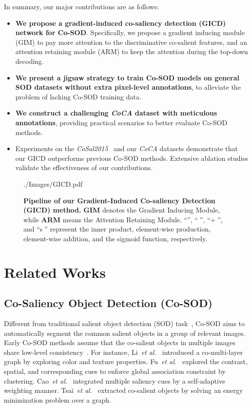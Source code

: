 \documentclass[runningheads,orivec]{llncs}
\def\etal{{\em et al.~}}
\begin{document}
In summary, our major contributions are as follows:
\begin{itemize}
	\item \textbf{We propose a gradient-induced co-saliency detection (GICD) network for Co-SOD}.
Specifically, we propose a gradient inducing module (GIM) to pay more attention to the discriminative co-salient features, and an attention retaining module (ARM) to keep the attention during the top-down decoding.
\item \textbf{We present a jigsaw strategy to train Co-SOD models on general SOD datasets without extra pixel-level annotations}, to alleviate the problem of lacking Co-SOD training data.
	\item \textbf{We construct a challenging \textit{CoCA} dataset with meticulous annotations}, providing practical scenarios to better evaluate Co-SOD methods.
	\item Experiments on the \textit{CoSal2015}~\cite{zhang2016CoSal} and our \textit{CoCA} datasets demonstrate that our GICD outperforms previous Co-SOD methods. 
Extensive ablation studies validate the effectiveness of our contributions. 
\end{itemize}



\begin{figure}[t]
	\centering
	\begin{overpic}[width=.95\columnwidth]{./Images/GICD.pdf}
	\end{overpic}
	\caption{\textbf{Pipeline of our Gradient-Induced Co-saliency Detection (GICD) method.}
		\textbf{GIM} denotes the Gradient Inducing Module, while \textbf{ARM} means the Attention Retaining Module.
		``'', ``\textcircled{}'', ``\textcircled{+}'', and ``\textcircled{s}'' represent the inner product, element-wise production, element-wise addition, and the sigmoid function, respectively.
}
	\label{fig:pipeline}
\end{figure}



\section{Related Works}
\subsection{Co-Saliency Object Detection (Co-SOD)}
Different from traditional salient object detection (SOD) task~\cite{fan2018foreground,fan2020bbs,gao2020sod100k}, Co-SOD aims to automatically segment the common salient objects in a group of relevant images.
Early Co-SOD methods assume that the co-salient objects in multiple images share low-level consistency~\cite{zhang2016co}. 
For instance, Li~\etal\cite{li2011co} introduced a co-multi-layer graph by exploring color and texture properties.
Fu~\etal\cite{fu2013cluster} explored the contrast, spatial, and corresponding cues to enforce global association constraint by clustering.
Cao~\etal\cite{cao2014self} integrated multiple saliency cues by a self-adaptive weighting manner. Tsai~\etal\cite{tsai2018image} extracted co-salient objects by solving an energy minimization problem over a graph.
\end{document}
